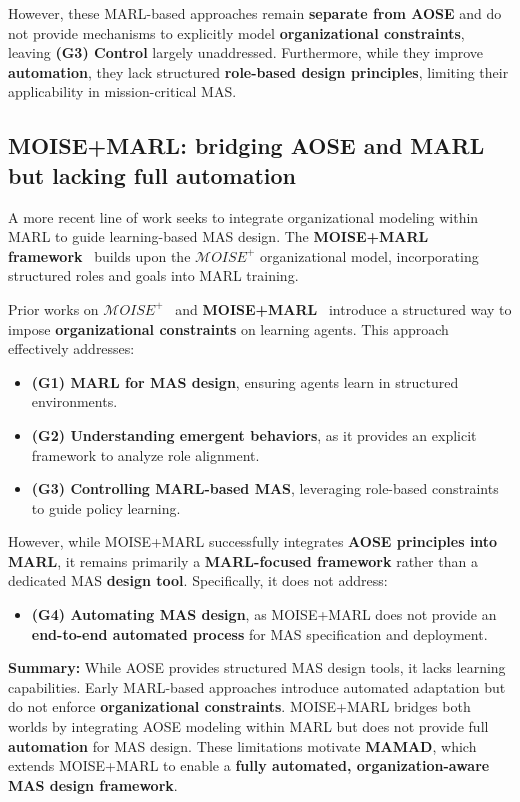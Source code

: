\documentclass[pdflatex,sn-mathphys-num]{sn-jnl}%
\theoremstyle{thmstyleone}%
\theoremstyle{thmstyletwo}%
\theoremstyle{thmstylethree}%
\begin{document}
However, these MARL-based approaches remain \textbf{separate from AOSE} and do not provide mechanisms to explicitly model \textbf{organizational constraints}, leaving \textbf{(G3) Control} largely unaddressed. Furthermore, while they improve \textbf{automation}, they lack structured \textbf{role-based design principles}, limiting their applicability in mission-critical MAS.

\subsection{MOISE+MARL: bridging AOSE and MARL but lacking full automation}

A more recent line of work seeks to integrate organizational modeling within MARL to guide learning-based MAS design. The \textbf{MOISE+MARL framework}~\cite{soule2025moisemarl} builds upon the \textbf{$\mathcal{M}OISE^+$} organizational model, incorporating structured roles and goals into MARL training. 

Prior works on $\mathcal{M}OISE^+$~\cite{hubner2007moise} and \textbf{MOISE+MARL}~\cite{soule2025moisemarl} introduce a structured way to impose \textbf{organizational constraints} on learning agents. This approach effectively addresses:
%
\begin{itemize}
    \item \textbf{(G1) MARL for MAS design}, ensuring agents learn in structured environments.
    \item \textbf{(G2) Understanding emergent behaviors}, as it provides an explicit framework to analyze role alignment.
    \item \textbf{(G3) Controlling MARL-based MAS}, leveraging role-based constraints to guide policy learning.
\end{itemize}

However, while MOISE+MARL successfully integrates \textbf{AOSE principles into MARL}, it remains primarily a \textbf{MARL-focused framework} rather than a dedicated MAS \textbf{design tool}. Specifically, it does not address:
%
\begin{itemize}
    \item \textbf{(G4) Automating MAS design}, as MOISE+MARL does not provide an \textbf{end-to-end automated process} for MAS specification and deployment.
\end{itemize}

\medskip

\noindent \textbf{Summary:} While AOSE provides structured MAS design tools, it lacks learning capabilities. Early MARL-based approaches introduce automated adaptation but do not enforce \textbf{organizational constraints}. MOISE+MARL bridges both worlds by integrating AOSE modeling within MARL but does not provide full \textbf{automation} for MAS design. These limitations motivate \textbf{MAMAD}, which extends MOISE+MARL to enable a \textbf{fully automated, organization-aware MAS design framework}.
\end{document}
